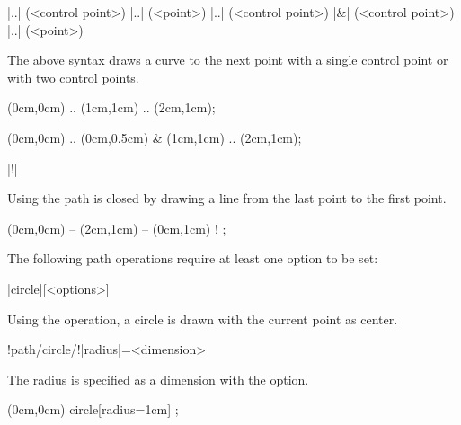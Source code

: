 \documentclass[a4paper]{article}
\begin{document}
{{\begin{macrodef}
|..| (<control point>) |..| (<point>)
|..| (<control point>) |&| (<control point>) |..| (<point>)
\end{macrodef}
The above syntax draws a curve to the next point with a single control point or with two control points.

\begin{codeexamplecolumns}
\begin{qdraw}
  \path[stroke] (0cm,0cm)
    .. (1cm,1cm) 
    .. (2cm,1cm);
\end{qdraw}
\end{codeexamplecolumns}

\begin{codeexamplecolumns}
\begin{qdraw}
  \path[stroke] (0cm,0cm)
    .. (0cm,0.5cm) & (1cm,1cm)
    .. (2cm,1cm);
\end{qdraw}
\end{codeexamplecolumns}

\begin{macrodef}
|!|
\end{macrodef}
Using \macro{!} the path is closed by drawing a line from the last point to the first point.

\begin{codeexamplecolumns}
\begin{qdraw}
  \path[stroke] (0cm,0cm)
    -- (2cm,1cm) 
    -- (0cm,1cm) ! ;
\end{qdraw}
\end{codeexamplecolumns}

\bigskip 

The following path operations require at least one option to be set:

\begin{macrodef}
|circle|[<options>]
\end{macrodef}
Using the  operation, a circle is drawn with the current point as center.

\begin{macrodef}
!path/circle/!|radius|={<dimension>}
\end{macrodef}
The radius is specified as a dimension with the  option.

\begin{codeexamplecolumns}
\begin{qdraw}
  \path[stroke] (0cm,0cm)
    circle[radius={1cm}] ;
\end{qdraw}
\end{codeexamplecolumns}

}}
\end{document}

